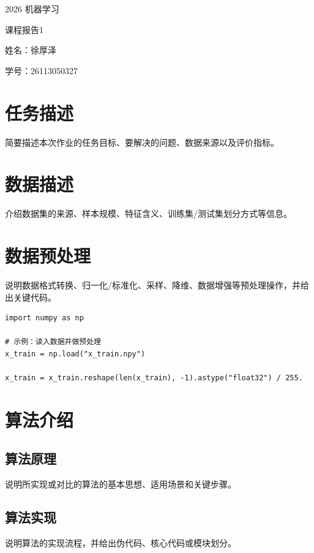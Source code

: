 \documentclass[UTF8,zihao=-4]{ctexart}
\newcommand{\ReportCourse}{2026 机器学习}
\newcommand{\ReportNo}{1}
\newcommand{\ReportName}{徐厚泽}
\newcommand{\ReportStudentID}{26113050327}
\begin{document}
\begin{titlepage}
  \centering
  \vspace*{1.2cm}
  {\heiti{}\ReportCourse\par}
  \vspace{1.5em}
  {\heiti{}课程报告\ReportNo\par}
  \vfill
  {\kaishu{}姓名：\ReportName\par}
  \vspace{0.8em}
  {\kaishu{}学号：\ReportStudentID\par}
  \vfill
\end{titlepage}

\section{任务描述}
简要描述本次作业的任务目标、要解决的问题、数据来源以及评价指标。

\section{数据描述}
介绍数据集的来源、样本规模、特征含义、训练集/测试集划分方式等信息。

\section{数据预处理}
说明数据格式转换、归一化/标准化、采样、降维、数据增强等预处理操作，并给出关键代码。

\begin{lstlisting}
import numpy as np

# 示例：读入数据并做预处理
x_train = np.load("x_train.npy")

x_train = x_train.reshape(len(x_train), -1).astype("float32") / 255.
\end{lstlisting}

\section{算法介绍}
\subsection{算法原理}
说明所实现或对比的算法的基本思想、适用场景和关键步骤。

\subsection{算法实现}
说明算法的实现流程，并给出伪代码、核心代码或模块划分。
\end{document}
